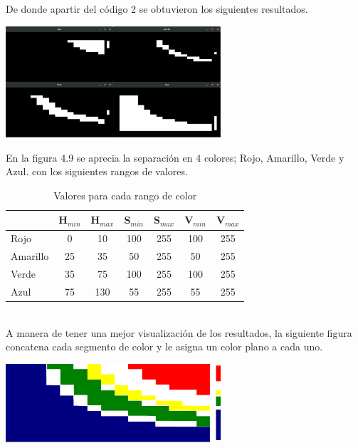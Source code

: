 De donde apartir del código 2 se obtuvieron los siguientes resultados.
\begin{center}
	\includegraphics[width=0.6\textwidth]{Contenido/Cuerpo/Capitulo4/Fig5.eps}
	\label{Fig6}
\end{center}
En la figura 4.9 se aprecia la separación en 4 colores; Rojo, Amarillo, Verde y Azul.
con los siguientes rangos de valores.\\
\begin{table}[ht]
	\begin{center}
		\caption{Valores para cada rango de color}
		\begin{tabular}[t]{lcccccc}
			\hline
			         & H$_{min}$ & H$_{max}$ & S$_{min}$ & S$_{max}$ & V$_{min}$ & V$_{max}$ \\
			\hline
			Rojo     & 0         & 10        & 100       & 255       & 100       & 255       \\
			Amarillo & 25        & 35        & 50        & 255       & 50        & 255       \\
			Verde    & 35        & 75        & 100       & 255       & 100       & 255       \\
			Azul     & 75        & 130       & 55        & 255       & 55        & 255       \\
			\hline
		\end{tabular}
	\end{center}
\end{table}\\
A manera de tener una mejor visualización de los resultados, la siguiente figura concatena
cada segmento de color y le asigna un color plano a cada uno.
\begin{center}
	\includegraphics[width=0.6\textwidth]{Contenido/Cuerpo/Capitulo4/Fig6.eps}
	\label{Fig6}
\end{center}

